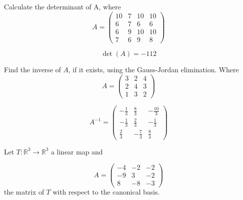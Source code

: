 \begin{questions}

\question Calculate the determinant of A, where
$$
A=\left(\begin{array}{rrrr}
10 & 7 & 10 & 10 \\
6 & 7 & 6 & 6 \\
6 & 9 & 10 & 10 \\
7 & 6 & 9 & 8
\end{array}\right)
$$

\begin{solution}
$$\det(A)=-112$$
\end{solution}

\question Find the inverse of $A$, if it exists, using the Gauss-Jordan elimination. Where
$$
A=\left(\begin{array}{rrr}
3 & 2 & 4 \\
2 & 4 & 3 \\
1 & 3 & 2
\end{array}\right)
$$

\begin{solution}
$$A^{-1}=\left(\begin{array}{rrr}
-\frac{1}{3} & \frac{8}{3} & -\frac{10}{3} \\
-\frac{1}{3} & \frac{2}{3} & -\frac{1}{3} \\
\frac{2}{3} & -\frac{7}{3} & \frac{8}{3}
\end{array}\right)$$
\end{solution}

\question Let $T:\mathbb{R}^3\rightarrow\mathbb{R}^3$  a linear map and
 
$$
A=\left(\begin{array}{rrr}
-4 & -2 & -2 \\
-9 & 3 & -2 \\
8 & -8 & -3
\end{array}\right)
$$
the matrix of $T$ with respect to the canonical basis.
\end{questions}
